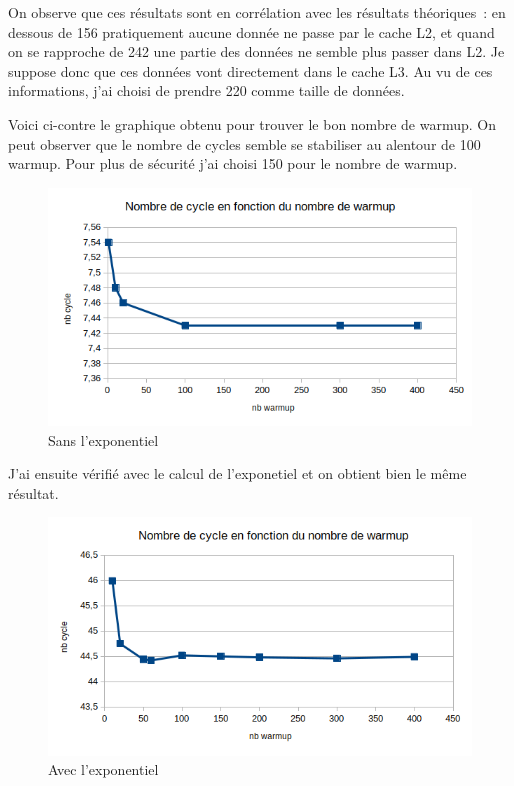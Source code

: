 \documentclass[12pt,a4paper]{article}
\begin{document}
On observe que ces résultats sont en corrélation avec les résultats théoriques :
en dessous de 156 pratiquement aucune donnée ne passe par le cache L2, et 
quand on se rapproche de 242 une partie des données ne semble plus passer 
dans L2. Je suppose donc que ces données vont directement dans le cache L3.
Au vu de ces informations, j'ai choisi de prendre 220 comme taille de 
données.

Voici ci-contre le graphique obtenu pour trouver le bon nombre de warmup. On
peut observer que le nombre de cycles semble se stabiliser au alentour de 100
warmup. Pour plus de sécurité j'ai choisi 150 pour le nombre de warmup.

\begin{figure}[h]
    \includegraphics[scale=0.8]{figures/L2/L2warmup.png}
    \caption{Sans l'exponentiel}
\end{figure}

J'ai ensuite vérifié avec le calcul de l'exponetiel et on obtient bien le 
même résultat. 

\begin{figure}[h]
    \includegraphics[scale=0.8]{figures/L2/L2warmup2.png}
    \caption{Avec l'exponentiel}
\end{figure}
\end{document}
